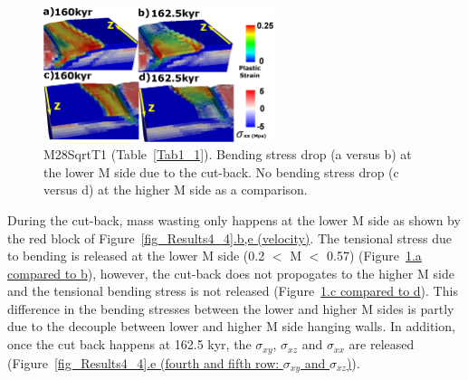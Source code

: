 \begin{figure}[h]
  \centering
    \includegraphics[width=0.6\textwidth]{./Figures/fig_Results4_6_sqrt_cut_back_bending_drop.eps}
  \caption{M28SqrtT1 (Table~\hyperref[Tab1_1]{\ref{Tab1_1}}). Bending stress drop (a versus b) at the lower M side due to the cut-back. No bending stress drop (c versus d) at the higher M side as a comparison.}
 \label{fig_Results4_6}
\end{figure}

During the cut-back, mass wasting only happens at the lower M side as shown by the red block of Figure~\hyperref[fig_Results4_4]{\ref{fig_Results4_4}.b,e (velocity)}. The tensional stress due to bending is released at the lower M side (0.2 $<$ M $<$ 0.57) (Figure~\hyperref[fig_Results4_6]{\ref{fig_Results4_6}.a compared to b}), however, the cut-back does not propogates to the higher M side and the tensional bending stress is not released (Figure~\hyperref[fig_Results4_6]{\ref{fig_Results4_6}.c compared to d}). This difference in the bending stresses between the lower and higher M sides is partly due to the decouple between lower and higher M side hanging walls. In addition, once the cut back happens at 162.5 kyr, the $\sigma_{xy}$, $\sigma_{xz}$ and $\sigma_{xx}$ are released (Figure~\hyperref[fig_Results4_4]{\ref{fig_Results4_4}.e (fourth and fifth row: $\sigma_{xy}$ and $\sigma_{xz}$)}). %

